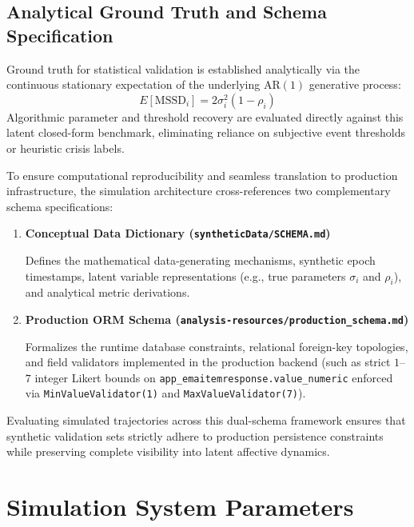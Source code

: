 \documentclass[11pt,letterpaper]{article}
\begin{document}
\subsection{Analytical Ground Truth and Schema Specification}

Ground truth for statistical validation is established analytically via the continuous stationary expectation of the underlying $\text{AR}(1)$ generative process:
\begin{equation}
E[\text{MSSD}_i] = 2\sigma_i^2(1 - \rho_i)
\end{equation}
Algorithmic parameter and threshold recovery are evaluated directly against this latent closed-form benchmark, eliminating reliance on subjective event thresholds or heuristic crisis labels.

To ensure computational reproducibility and seamless translation to production infrastructure, the simulation architecture cross-references two complementary schema specifications:
\begin{enumerate}
    \item \textbf{Conceptual Data Dictionary (\texttt{syntheticData/SCHEMA.md})} 
    
    Defines the mathematical data-generating mechanisms, synthetic epoch timestamps, latent variable representations (e.g., true parameters $\sigma_i$ and $\rho_i$), and analytical metric derivations.
    \item \textbf{Production ORM Schema (\texttt{analysis-resources/production\_schema.md})} 
    
    Formalizes the runtime database constraints, relational foreign-key topologies, and field validators implemented in the production backend (such as strict $1$--$7$ integer Likert bounds on \texttt{app\_emaitemresponse.value\_numeric} enforced via \texttt{MinValueValidator(1)} and \texttt{MaxValueValidator(7)}).
\end{enumerate}
Evaluating simulated trajectories across this dual-schema framework ensures that synthetic validation sets strictly adhere to production persistence constraints while preserving complete visibility into latent affective dynamics.



\section{Simulation System Parameters}
\end{document}
